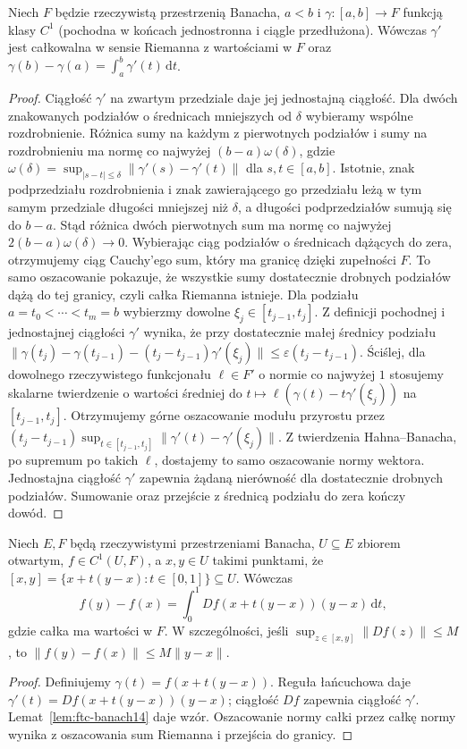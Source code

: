 \begin{lemat}
\label{lem:ftc-banach14}
Niech $F$ będzie rzeczywistą przestrzenią Banacha, $a<b$ i $\gamma:[a,b]\to F$ funkcją klasy $C^1$ (pochodna w końcach jednostronna i ciągle przedłużona). Wówczas $\gamma'$ jest całkowalna w sensie Riemanna z wartościami w $F$ oraz
$\gamma(b)-\gamma(a)=\int_a^b\gamma'(t)\,\mathrm dt$.
\end{lemat}
\begin{proof}
Ciągłość $\gamma'$ na zwartym przedziale daje jej jednostajną ciągłość. Dla dwóch znakowanych podziałów o średnicach mniejszych od $\delta$ wybieramy wspólne rozdrobnienie. Różnica sumy na każdym z pierwotnych podziałów i sumy na rozdrobnieniu ma normę co najwyżej $(b-a)\omega(\delta)$, gdzie $\omega(\delta)=\sup_{|s-t|\le\delta}\|\gamma'(s)-\gamma'(t)\|$ dla $s,t\in[a,b]$. Istotnie, znak podprzedziału rozdrobnienia i znak zawierającego go przedziału leżą w tym samym przedziale długości mniejszej niż $\delta$, a długości podprzedziałów sumują się do $b-a$. Stąd różnica dwóch pierwotnych sum ma normę co najwyżej $2(b-a)\omega(\delta)\to0$. Wybierając ciąg podziałów o średnicach dążących do zera, otrzymujemy ciąg Cauchy'ego sum, który ma granicę dzięki zupełności $F$. To samo oszacowanie pokazuje, że wszystkie sumy dostatecznie drobnych podziałów dążą do tej granicy, czyli całka Riemanna istnieje. Dla podziału $a=t_0<\cdots<t_m=b$ wybierzmy dowolne $\xi_j\in[t_{j-1},t_j]$. Z definicji pochodnej i jednostajnej ciągłości $\gamma'$ wynika, że przy dostatecznie małej średnicy podziału
$\|\gamma(t_j)-\gamma(t_{j-1})-(t_j-t_{j-1})\gamma'(\xi_j)\|\le\varepsilon(t_j-t_{j-1})$.
Ściślej, dla dowolnego rzeczywistego funkcjonału $\ell\in F'$ o normie co najwyżej $1$ stosujemy skalarne twierdzenie o wartości średniej do $t\mapsto\ell(\gamma(t)-t\gamma'(\xi_j))$ na $[t_{j-1},t_j]$. Otrzymujemy górne oszacowanie modułu przyrostu przez $(t_j-t_{j-1})\sup_{t\in[t_{j-1},t_j]}\|\gamma'(t)-\gamma'(\xi_j)\|$. Z twierdzenia Hahna--Banacha, po supremum po takich $\ell$, dostajemy to samo oszacowanie normy wektora. Jednostajna ciągłość $\gamma'$ zapewnia żądaną nierówność dla dostatecznie drobnych podziałów. Sumowanie oraz przejście z średnicą podziału do zera kończy dowód.
\end{proof}

\begin{twierdzenie}
\label{thm:mean-value14}
Niech $E,F$ będą rzeczywistymi przestrzeniami Banacha, $U\subseteq E$ zbiorem otwartym, $f\in C^1(U,F)$, a $x,y\in U$ takimi punktami, że $[x,y]=\{x+t(y-x):t\in[0,1]\}\subseteq U$. Wówczas
\[
f(y)-f(x)=\int_0^1 Df(x+t(y-x))(y-x)\,\mathrm dt,
\]
gdzie całka ma wartości w $F$. W szczególności, jeśli $\sup_{z\in[x,y]}\|Df(z)\|\le M$, to $\|f(y)-f(x)\|\le M\|y-x\|$.
\end{twierdzenie}
\begin{proof}
Definiujemy $\gamma(t)=f(x+t(y-x))$. Reguła łańcuchowa daje $\gamma'(t)=Df(x+t(y-x))(y-x)$; ciągłość $Df$ zapewnia ciągłość $\gamma'$. Lemat~\ref{lem:ftc-banach14} daje wzór. Oszacowanie normy całki przez całkę normy wynika z oszacowania sum Riemanna i przejścia do granicy.
\end{proof}

